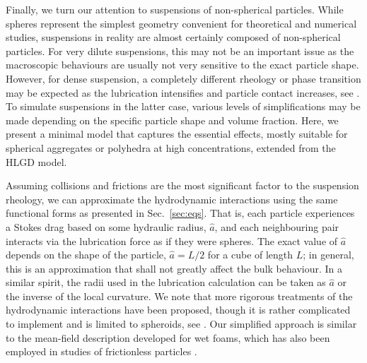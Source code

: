 Finally, we turn our attention to suspensions of non-spherical particles. While spheres represent the simplest geometry convenient for theoretical and numerical studies, suspensions in reality are almost certainly composed of non-spherical particles. For very dilute suspensions, this may not be an important issue as the macroscopic behaviours are usually not very sensitive to the exact particle shape. However, for dense suspension, a completely different rheology or phase transition may be expected as the lubrication intensifies and particle contact increases, see \eg \cite{Damasceno453, Royer_etal_2015, trulsson_2018}. To simulate suspensions in the latter case, various levels of simplifications may be made depending on the specific particle shape and volume fraction. Here, we present a minimal model that captures the essential effects, mostly suitable for spherical aggregates or polyhedra at high concentrations, extended from the HLGD model.

Assuming collisions and frictions are the most significant factor to the suspension rheology, we can approximate the hydrodynamic interactions using the same functional forms as presented in Sec.\ \ref{sec:eqs}. That is, each particle experiences a Stokes drag based on some hydraulic radius, $\hat{a}$, and each neighbouring pair interacts via the lubrication force as if they were spheres. The exact value of $\hat{a}$ depends on the shape of the particle, \eg $\hat{a}=L/2$ for a cube of length $L$; in general, this is an approximation that shall not greatly affect the bulk behaviour. In a similar spirit, the radii used in the lubrication calculation can be taken as $\hat{a}$ or the inverse of the local curvature. We note that more rigorous treatments of the hydrodynamic interactions have been proposed, though it is rather complicated to implement and is limited to spheroids, see \eg \cite{claeys_brady_1993}. Our simplified approach is similar to the mean-field description developed for wet foams, which has also been employed in studies of frictionless particles \citep{Durian_1997PRE, Marschall_etal_2019}.

